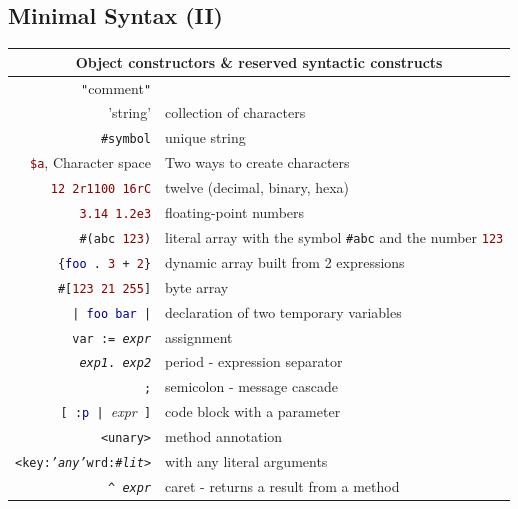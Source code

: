 \documentclass[notumble]{leaflet}
\newcommand{\code}[1]{\foreignlanguage{english}{\texttt{#1}}}
\begin{document}
\subsection{Minimal Syntax (II)}
\noindent
\begin{tabularx}{\linewidth}{@{}rX@{}}
        \toprule
        \multicolumn{2}{c}{Object constructors \& reserved syntactic constructs}\\
        \midrule
        \textcolor{comment}{\code{"}{comment}\code{"}}& \\
        \textcolor{string}{'string'}&collection of characters\\
        \textcolor{string}{\code{\#symbol}}&unique string \\
        \textcolor{darkRed}{\code{\$a}}, Character space &Two ways to create characters\\
        \textcolor{darkRed}{\code{12 2r1100 16rC}} & twelve (decimal, binary, hexa)\\
        \textcolor{darkRed}{\code{3.14 1.2e3}}&floating-point numbers\\
        \code{\#(\textcolor{string}{abc} \textcolor{darkRed}{123})}&literal array with the symbol \textcolor{string}{\code{\#abc}} and the number \textcolor{darkRed}{\code{123}} \\
        \code{\{\textcolor{darkBlue}{foo}\,.\ \textcolor{darkRed}{3}\,+\,\textcolor{darkRed}{2}\}}&dynamic array built from 2 expressions\\
        \code{\#[\textcolor{darkRed}{123 21 255}]} &byte array \\ 
        \midrule
        
        \code{|\,\textcolor{darkBlue}{foo bar}\,|} &declaration of two temporary variables \\
        \code{var := \emph{expr}}&assignment \\
        \code{\emph{exp1}. \emph{exp2}} &period -  expression separator\\
        \code{;} &semicolon - message cascade\\
        \code{[\,:\textcolor{darkBlue}{p}\,|\,}\emph{expr}\code{\,]} &code block with a parameter \\
        \code{<unary>}&method annotation \\
        \code{<key:\emph{'any'}wrd:\emph{\#lit}>}&with any literal arguments\\
        \code{\textasciicircum\ \emph{expr}} &caret - returns a result from a method\\
        \bottomrule
\end{tabularx}
\end{document}
